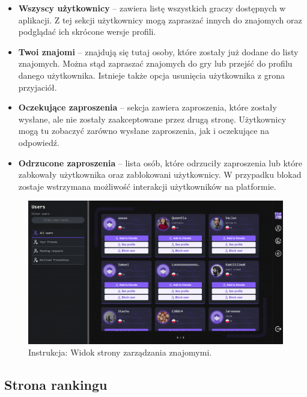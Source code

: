 \documentclass[twoside]{projektInzynierskiMS1}
\begin{document}
\begin{itemize}
    \item \textbf{Wszyscy użytkownicy} – zawiera listę wszystkich graczy dostępnych w aplikacji. Z tej sekcji użytkownicy mogą zapraszać innych do znajomych oraz podglądać ich skrócone wersje profili.

    \item \textbf{Twoi znajomi} – znajdują się tutaj osoby, które zostały już dodane do listy znajomych. Można stąd zapraszać znajomych do gry lub przejść do profilu danego użytkownika. Istnieje także opcja usunięcia użytkownika z grona przyjaciół.

    \item \textbf{Oczekujące zaproszenia} – sekcja zawiera zaproszenia, które zostały wysłane, ale nie zostały zaakceptowane przez drugą stronę. Użytkownicy mogą tu zobaczyć zarówno wysłane zaproszenia, jak i oczekujące na odpowiedź.

    \item \textbf{Odrzucone zaproszenia} – lista osób, które odrzuciły zaproszenia lub które zabkowały użytkownika oraz zablokowani użytkownicy. W przypadku blokad zostaje wstrzymana możliwość interakcji użytkowników na platformie.

\end{itemize}

\vspace{0.5cm}
\begin{figure}[h!]
    \centering
    \includegraphics[width=1\textwidth]{images/ins_users.png}
    \caption{Instrukcja: Widok strony zarządzania znajomymi.}
\end{figure}

\newpage

\subsection{Strona rankingu}
\end{document}
